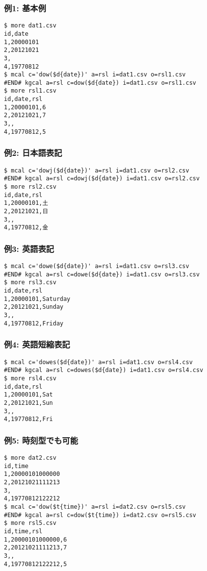 \subsubsection*{例1: 基本例}



\begin{Verbatim}[baselinestretch=0.7,frame=single]
$ more dat1.csv
id,date
1,20000101
2,20121021
3,
4,19770812
$ mcal c='dow($d{date})' a=rsl i=dat1.csv o=rsl1.csv
#END# kgcal a=rsl c=dow($d{date}) i=dat1.csv o=rsl1.csv
$ more rsl1.csv
id,date,rsl
1,20000101,6
2,20121021,7
3,,
4,19770812,5
\end{Verbatim}
\subsubsection*{例2: 日本語表記}



\begin{Verbatim}[baselinestretch=0.7,frame=single]
$ mcal c='dowj($d{date})' a=rsl i=dat1.csv o=rsl2.csv
#END# kgcal a=rsl c=dowj($d{date}) i=dat1.csv o=rsl2.csv
$ more rsl2.csv
id,date,rsl
1,20000101,土
2,20121021,日
3,,
4,19770812,金
\end{Verbatim}
\subsubsection*{例3: 英語表記}



\begin{Verbatim}[baselinestretch=0.7,frame=single]
$ mcal c='dowe($d{date})' a=rsl i=dat1.csv o=rsl3.csv
#END# kgcal a=rsl c=dowe($d{date}) i=dat1.csv o=rsl3.csv
$ more rsl3.csv
id,date,rsl
1,20000101,Saturday
2,20121021,Sunday
3,,
4,19770812,Friday
\end{Verbatim}
\subsubsection*{例4: 英語短縮表記}



\begin{Verbatim}[baselinestretch=0.7,frame=single]
$ mcal c='dowes($d{date})' a=rsl i=dat1.csv o=rsl4.csv
#END# kgcal a=rsl c=dowes($d{date}) i=dat1.csv o=rsl4.csv
$ more rsl4.csv
id,date,rsl
1,20000101,Sat
2,20121021,Sun
3,,
4,19770812,Fri
\end{Verbatim}
\subsubsection*{例5: 時刻型でも可能}



\begin{Verbatim}[baselinestretch=0.7,frame=single]
$ more dat2.csv
id,time
1,20000101000000
2,20121021111213
3,
4,19770812122212
$ mcal c='dow($t{time})' a=rsl i=dat2.csv o=rsl5.csv
#END# kgcal a=rsl c=dow($t{time}) i=dat2.csv o=rsl5.csv
$ more rsl5.csv
id,time,rsl
1,20000101000000,6
2,20121021111213,7
3,,
4,19770812122212,5
\end{Verbatim}
